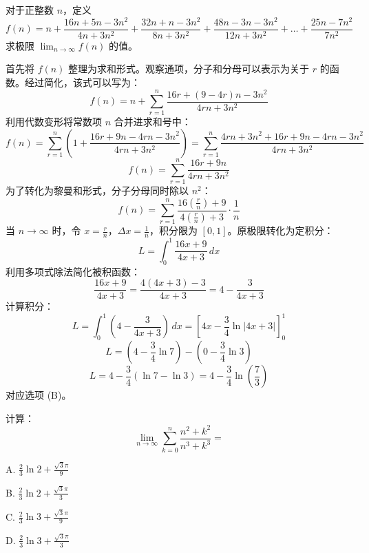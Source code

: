 \begin{questions}
    \question
对于正整数 $n$，定义
\[
f(n) = n + \frac{16n + 5n - 3n^2}{4n + 3n^2} + \frac{32n + n - 3n^2}{8n + 3n^2} + \frac{48n - 3n - 3n^2}{12n + 3n^2} + \dots + \frac{25n - 7n^2}{7n^2}
\]
求极限 $\lim_{n \to \infty} f(n)$ 的值。

\begin{solution}
首先将 $f(n)$ 整理为求和形式。观察通项，分子和分母可以表示为关于 $r$ 的函数。经过简化，该式可以写为：
\[
f(n) = n + \sum_{r=1}^{n} \frac{16r + (9-4r)n - 3n^2}{4rn + 3n^2}
\]
利用代数变形将常数项 $n$ 合并进求和号中：
\[
f(n) = \sum_{r=1}^{n} \left( 1 + \frac{16r + 9n - 4rn - 3n^2}{4rn + 3n^2} \right) = \sum_{r=1}^{n} \frac{4rn + 3n^2 + 16r + 9n - 4rn - 3n^2}{4rn + 3n^2}
\]
\[
f(n) = \sum_{r=1}^{n} \frac{16r + 9n}{4rn + 3n^2}
\]
为了转化为黎曼和形式，分子分母同时除以 $n^2$：
\[
f(n) = \sum_{r=1}^{n} \frac{16(\frac{r}{n}) + 9}{4(\frac{r}{n}) + 3} \cdot \frac{1}{n}
\]
当 $n \to \infty$ 时，令 $x = \frac{r}{n}$，$\Delta x = \frac{1}{n}$，积分限为 $[0, 1]$。原极限转化为定积分：
\[
L = \int_{0}^{1} \frac{16x + 9}{4x + 3} \,dx
\]
利用多项式除法简化被积函数：
\[
\frac{16x + 9}{4x + 3} = \frac{4(4x + 3) - 3}{4x + 3} = 4 - \frac{3}{4x + 3}
\]
计算积分：
\[
L = \int_{0}^{1} \left( 4 - \frac{3}{4x + 3} \right) \,dx = \left[ 4x - \frac{3}{4} \ln|4x + 3| \right]_{0}^{1}
\]
\[
L = (4 - \frac{3}{4} \ln 7) - (0 - \frac{3}{4} \ln 3)
\]
\[
L = 4 - \frac{3}{4} (\ln 7 - \ln 3) = 4 - \frac{3}{4} \ln\left(\frac{7}{3}\right)
\]
对应选项 (B)。
\end{solution}

\question
计算：
\[
\lim_{n \to \infty} \sum_{k=0}^{n} \frac{n^2 + k^2}{n^3 + k^3} =
\]

A. $\frac{2}{3} \ln 2 + \frac{\sqrt{3}\pi}{9}$

B. $\frac{2}{3} \ln 2 + \frac{\sqrt{3}\pi}{3}$

C. $\frac{2}{3} \ln 3 + \frac{\sqrt{3}\pi}{9}$

D. $\frac{2}{3} \ln 3 + \frac{\sqrt{3}\pi}{3}$


\end{questions}
